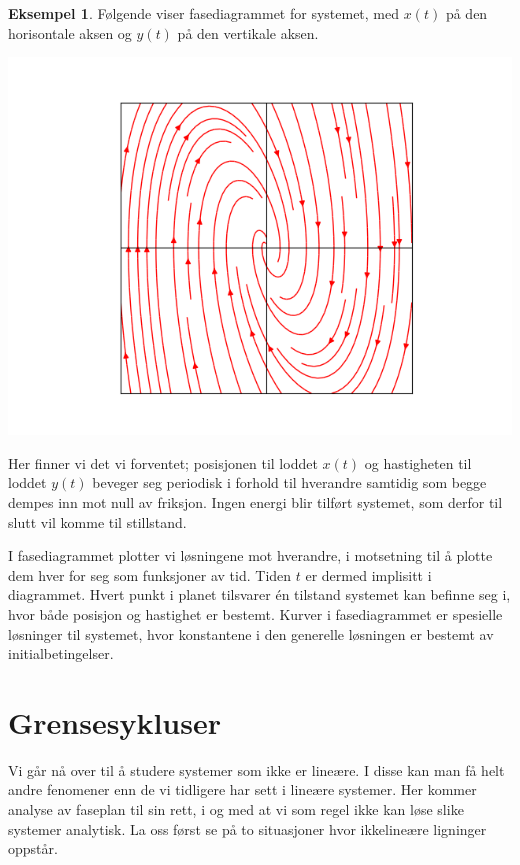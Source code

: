 \documentclass{article}
\theoremstyle{plain}
\theoremstyle{definition}
\newtheorem{eksempel}[teorem]{Eksempel}
\theoremstyle{remark}
\begin{document}
\begin{eksempel}
    Følgende viser fasediagrammet for systemet, med $x(t)$ på den horisontale aksen og $y(t)$ på den vertikale aksen.
    \begin{center}
        \includegraphics[scale=0.5]{phase_plane_1.png}
    \end{center}
    Her finner vi det vi forventet; posisjonen til loddet $x(t)$ og hastigheten til loddet $y(t)$ beveger seg periodisk i forhold til hverandre samtidig som begge dempes inn mot null av friksjon. Ingen energi blir tilført systemet, som derfor til slutt vil komme til stillstand.
\end{eksempel}

I fasediagrammet plotter vi løsningene mot hverandre, i motsetning til å plotte dem hver for seg som funksjoner av tid. Tiden $t$ er dermed implisitt i diagrammet. Hvert punkt i planet tilsvarer én tilstand systemet kan befinne seg i, hvor både posisjon og hastighet er bestemt. Kurver i fasediagrammet er spesielle løsninger til systemet, hvor konstantene i den generelle løsningen er bestemt av initialbetingelser.

\section*{Grensesykluser}

Vi går nå over til å studere systemer som ikke er lineære. I disse kan man få helt andre fenomener enn de vi tidligere har sett i lineære systemer. Her kommer analyse av faseplan til sin rett, i og med at vi som regel ikke kan løse slike systemer analytisk. La oss først se på to situasjoner hvor ikkelineære ligninger oppstår.
\end{document}
